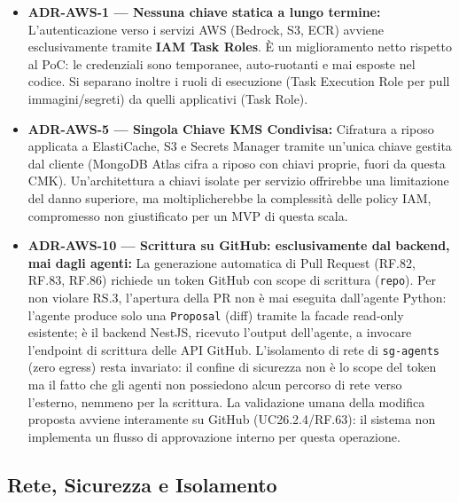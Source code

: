 \documentclass[11pt,a4paper]{article}
\begin{document}
\begin{itemize}
    \item \textbf{ADR-AWS-1 --- Nessuna chiave statica a lungo termine:} L'autenticazione verso i servizi AWS (Bedrock, S3, ECR) avviene esclusivamente tramite \textbf{IAM Task Roles}. È un miglioramento netto rispetto al PoC: le credenziali sono temporanee, auto-ruotanti e mai esposte nel codice. Si separano inoltre i ruoli di esecuzione (Task Execution Role per pull immagini/segreti) da quelli applicativi (Task Role).
    \item \textbf{ADR-AWS-5 --- Singola Chiave KMS Condivisa:} Cifratura a riposo applicata a ElastiCache, S3 e Secrets Manager tramite un'unica chiave gestita dal cliente (MongoDB Atlas cifra a riposo con chiavi proprie, fuori da questa CMK). Un'architettura a chiavi isolate per servizio offrirebbe una limitazione del danno superiore, ma moltiplicherebbe la complessità delle policy IAM, compromesso non giustificato per un MVP di questa scala.
    \item \textbf{ADR-AWS-10 --- Scrittura su GitHub: esclusivamente dal backend, mai dagli agenti:} La generazione automatica di Pull Request (RF.82, RF.83, RF.86) richiede un token GitHub con scope di scrittura (\texttt{repo}). Per non violare RS.3, l'apertura della PR non è mai eseguita dall'agente Python: l'agente produce solo una \texttt{Proposal} (diff) tramite la facade read-only esistente; è il backend NestJS, ricevuto l'output dell'agente, a invocare l'endpoint di scrittura delle API GitHub. L'isolamento di rete di \texttt{sg-agents} (zero egress) resta invariato: il confine di sicurezza non è lo scope del token ma il fatto che gli agenti non possiedono alcun percorso di rete verso l'esterno, nemmeno per la scrittura. La validazione umana della modifica proposta avviene interamente su GitHub (UC26.2.4/RF.63): il sistema non implementa un flusso di approvazione interno per questa operazione.
\end{itemize}

\subsection{Rete, Sicurezza e Isolamento}
\end{document}
